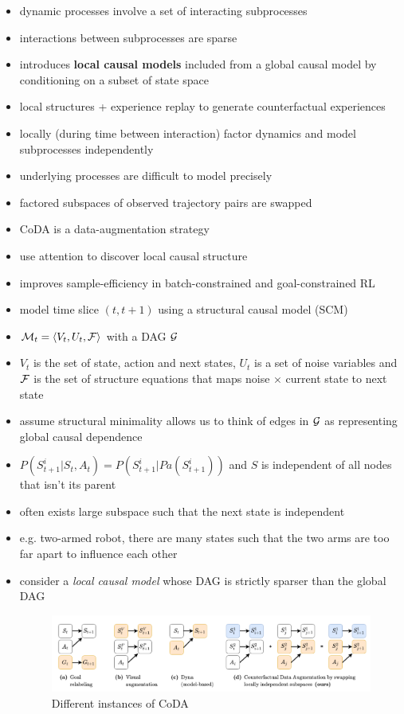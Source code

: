 \begin{itemize}
  \item dynamic processes involve a set of interacting subprocesses
  \item interactions between subprocesses are sparse
  \item introduces \textbf{local causal models} included from a global causal model by conditioning on a subset of state space
  \item local structures + experience replay to generate counterfactual experiences
  \item locally (during time between interaction) factor dynamics and model subprocesses independently
  \item underlying processes are difficult to model precisely
  \item factored subspaces of observed trajectory pairs are swapped
  \item CoDA is a data-augmentation strategy
  \item use attention to discover local causal structure
  \item improves sample-efficiency in batch-constrained and goal-constrained RL
  \item model time slice $(t, t+1)$ using a structural causal model (SCM)
  \item $\mathcal{M}_{t} = \langle V_{t}, U_{t}, \mathcal{F} \rangle$ with a DAG $\mathcal{G}$
  \item $V_{t}$ is the set of state, action and next states, $U_{t}$ is a set of noise variables and $\mathcal{F}$ is the set of structure equations that maps noise $\times$ current state to next state
  \item assume structural minimality allows us to think of edges in $\mathcal{G}$ as representing global causal dependence
  \item $P(S_{t+1}^{i}|S_{t}, A_{t}) = P(S_{t+1}^{i}|Pa(S_{t+1}^{i}))$ and $S$ is independent of all nodes that isn't its parent
  \item often exists large subspace such that the next state is independent
  \item e.g. two-armed robot, there are many states such that the two arms are too far apart to influence each other
  \item consider a \textit{local causal model} whose DAG is strictly sparser than the global DAG
  \begin{figure}[h]
    \caption{Different instances of CoDA}
    \centering
    \includegraphics[width=\textwidth]{../../imgs/coda.png}

\end{figure}
\end{itemize}

